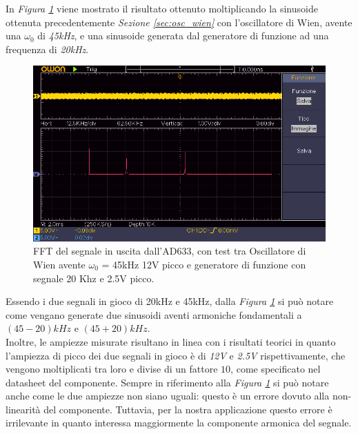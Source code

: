 \documentclass[titlepage]{report}
\begin{document}
	\noindent In \textit{Figura \ref{fig:FFTmixer}} viene mostrato il risultato ottenuto moltiplicando la sinusoide ottenuta precedentemente \textit{Sezione \ref{sec:osc_wien}} con l'oscillatore di Wien, avente una $\omega_0$ di \textit{45kHz}, e una sinusoide generata dal generatore di funzione ad una frequenza di \textit{20kHz}.

	\begin{figure}[H]
		\centering
		\includegraphics[scale=0.9]{Immagini/uscita_ad633_con_fcngen_20k_e_osc_45k.png}
		\caption{FFT del segnale in uscita dall'AD633, con test tra Oscillatore di Wien avente $\omega_0$ = 45kHz 12V picco e generatore di funzione con segnale 20 Khz e 2.5V picco.}
		\label{fig:FFTmixer}
	\end{figure}
	
	 \noindent Essendo i due segnali in gioco di 20kHz e 45kHz, dalla \textit{Figura \ref{fig:FFTmixer}} si può notare come vengano generate due sinusoidi aventi armoniche fondamentali a $(45-20)kHz$ e $(45+20)kHz$. %
	 \\
	 Inoltre, le ampiezze misurate risultano in linea con i risultati teorici in quanto l'ampiezza di picco dei due segnali in gioco è di \textit{12V} e \textit{2.5V} rispettivamente, che vengono moltiplicati tra loro e divise di un fattore $10$, come specificato nel datasheet del componente. Sempre in riferimento alla \textit{Figura \ref{fig:FFTmixer}} si può notare anche come le due ampiezze non siano uguali: questo è un errore dovuto alla non-linearità del componente. Tuttavia, per la nostra applicazione questo errore è irrilevante in quanto interessa maggiormente la componente armonica del segnale.
	
\end{document}
